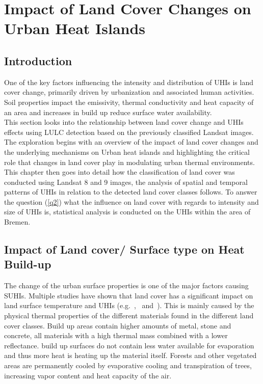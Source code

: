 \documentclass[12pt,a4paper, english,twoside]{scrartcl}
\begin{document}
\section{Impact of Land Cover Changes on Urban Heat Islands}\label{sec:LULC}
    \subsection{Introduction}
      One of the key factors influencing the intensity and distribution of \glspl{UHI} is land cover change, primarily driven by urbanization and associated human activities.
      Soil properties impact the emissivity, thermal conductivity and heat capacity of an area and increases in build up reduce surface water availability. 
      \\    
      This section looks into the relationship between land cover change and \glspl{UHI} effects using \gls{LULC} detection based on the previously classified Landsat images.
      The exploration begins with an overview of the impact of land cover changes and the underlying mechanisms on Urban heat islands and highlighting the critical role that changes in land cover play in modulating urban thermal environments.
      \\
      This chapter then goes into detail how the classification of land cover was conducted using Landsat 8 and 9 images, the analysis of spatial and temporal patterns of \glspl{UHI} in relation to the detected land cover classes follows.
      To answer the question (\cref{q2}) what the influence on land cover with regards to intensity and size of \glspl{UHI} is, statistical analysis is conducted on the \glspl{UHI} within the area of Bremen. \\
    \subsection{Impact of Land cover/ Surface type on Heat Build-up}
      The change of the urban surface properties is one of the major factors causing \glspl{SUHI}.  
      Multiple studies have shown that land cover has a significant impact on land surface temperature and \glspl{UHI} (e.g.~\cite{Karakus2019},~\cite{Weng2004} and~\cite{Stewart2011}). 
      This is mainly caused by the physical thermal properties of the different materials found in the different land cover classes. 
      Build up areas contain higher amounts of metal, stone and concrete, all materials with a high thermal mass combined with a lower reflectance.  
      build up surfaces do not contain less water available for evaporation and thus more heat is heating up the material itself.
      Forests and other vegetated areas are permanently cooled by evaporative cooling and transpiration of trees, increasing vapor content and heat capacity of the air.
\end{document}
